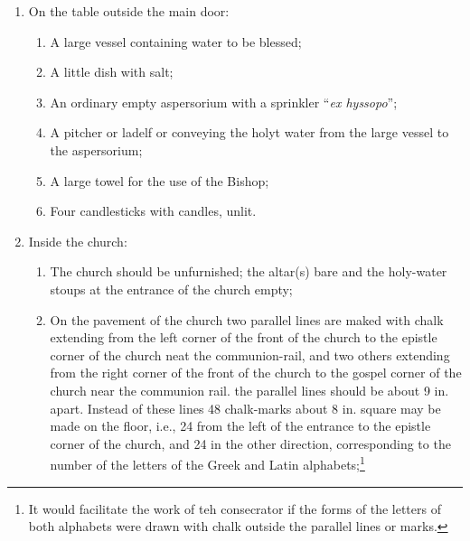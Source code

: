 \documentclass[letterpaper]{report}
\begin{document}
{\begin{enumerate}[label=\Roman*.]
\begin{enumerate}[label=\arabic*.]
                \item A tabled covered in white, to the right side of the door

            \end{enumerate}

        \item On the table outside the main door:

            \begin{enumerate}[label=\arabic*.]
                
                \item A large vessel containing water to be blessed;

                \item A little dish with salt;

                \item An ordinary empty aspersorium with a sprinkler
                    ``\textit{ex hyssopo}'';

                \item A pitcher or ladelf or conveying the holyt water from the
                    large vessel to the aspersorium;

                \item A large towel for the use of the Bishop;

                \item Four candlesticks with candles, unlit.

            \end{enumerate}

        \item Inside the church:

            \begin{enumerate}[label=\arabic*.]

                \item The church should be unfurnished; the altar(s) bare and
                    the holy-water stoups at the entrance of the  church empty;

                \item On the pavement of the church two parallel lines are
                    maked with chalk extending from the left corner of the
                    front of the church to the epistle corner of the church
                    neat the communion-rail, and two others extending from the
                    right corner of the front of the church to the gospel
                    corner of the church near the communion rail. the parallel
                    lines should be about 9 in. apart. Instead of these lines
                    48 chalk-marks about 8 in. square may be made on the floor,
                    i.e., 24 from the left of the entrance to the epistle
                    corner of the church, and 24 in the other direction,
                    corresponding to the number of the letters of the Greek and
                    Latin alphabets;\footnote{It would facilitate the work of
                    teh consecrator if the forms of the letters of both
                    alphabets were drawn with chalk outside the parallel lines
                    or marks.}


\end{enumerate}
\end{enumerate}}
\end{document}
